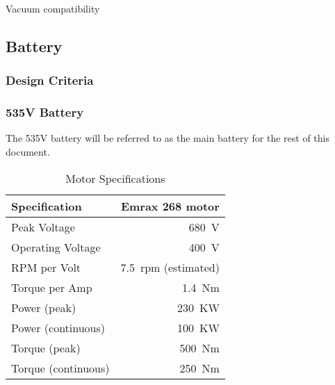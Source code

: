 \documentclass[main.tex]{subfiles}
\begin{document}
    Vacuum compatibility\\

    \subsection{Battery}
    \subsubsection{Design Criteria}
    \subsubsection{535V Battery}
    The 535V battery will be referred to as the main battery for the rest of this document.\\

    \begin{table}[H]
        \centering
        \begin{tabular}{@{}lr@{}} \toprule
            Specification & Emrax 268 motor\\ \midrule
            Peak Voltage & \SI{680}{V}\\
            Operating Voltage & \SI{400}{V}\\
            RPM per Volt & \SI{7.5}{rpm} (estimated)\\
            Torque per Amp & \SI{1.4}{Nm}\\
            Power (peak) & \SI{230}{KW}\\
            Power (continuous) & \SI{100}{KW}\\
            Torque (peak) & \SI{500}{Nm}\\
            Torque (continuous) & \SI{250}{Nm}\\ \bottomrule
        \end{tabular}
        \caption{Motor Specifications}
    \end{table}
\end{document}
